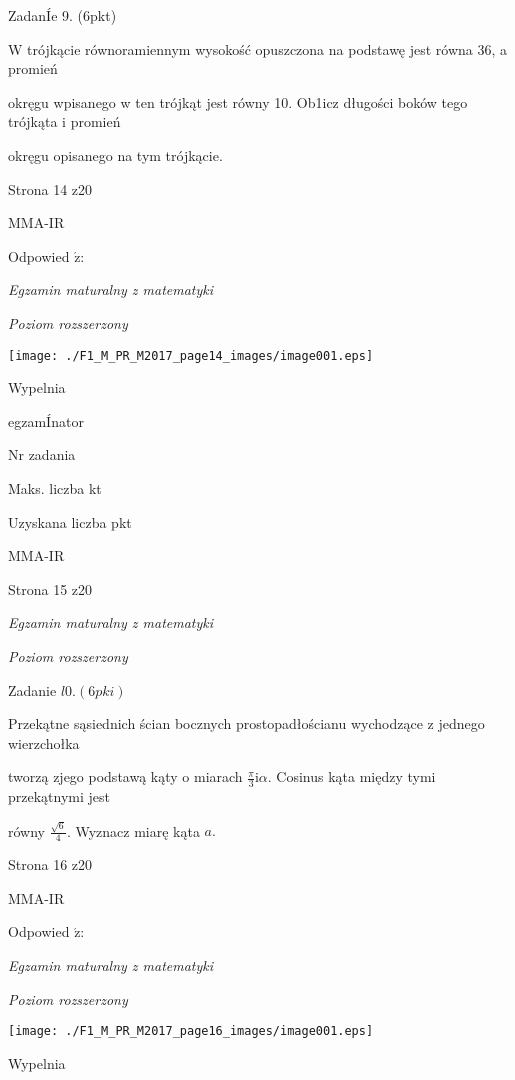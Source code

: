 \documentclass[a4paper,12pt]{article}
\begin{document}
ZadanÍe 9. (6pkt)

W trójkącie równoramiennym wysokość opuszczona na podstawę jest równa 36, a promień

okręgu wpisanego w ten trójkąt jest równy 10. Ob1icz długości boków tego trójkąta i promień

okręgu opisanego na tym trójkącie.

Strona 14 z20

MMA-IR





Odpowied $\acute{\mathrm{z}}$:

{\it Egzamin maturalny z matematyki}

{\it Poziom rozszerzony}
\begin{center}
\texttt{[image: ./F1\_M\_PR\_M2017\_page14\_images/image001.eps]}
\end{center}
Wypelnia

egzamÍnator

Nr zadania

Maks. liczba kt

Uzyskana liczba pkt

MMA-IR

Strona 15 z20





{\it Egzamin maturalny z matematyki}

{\it Poziom rozszerzony}

Zadanie $l0. (6pki)$

Przekątne sąsiednich ścian bocznych prostopadłościanu wychodzące z jednego wierzchołka

tworzą zjego podstawą kąty o miarach $\displaystyle \frac{\pi}{3} \mathrm{i} \alpha$. Cosinus kąta między tymi przekątnymi jest

równy $\displaystyle \frac{\sqrt{6}}{4}$. Wyznacz miarę kąta $a.$

Strona 16 z20

MMA-IR





Odpowied $\acute{\mathrm{z}}$:

{\it Egzamin maturalny z matematyki}

{\it Poziom rozszerzony}
\begin{center}
\texttt{[image: ./F1\_M\_PR\_M2017\_page16\_images/image001.eps]}
\end{center}
Wypelnia
\end{document}

